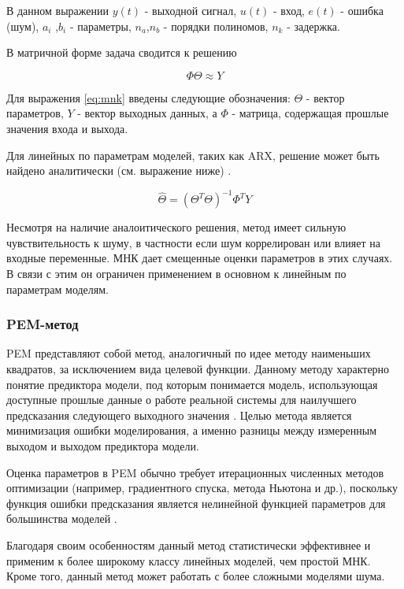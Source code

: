 В данном выражении $ y(t) $ - выходной сигнал,  $u(t)$ - вход, $e(t)$ - ошибка (шум), $a_i$ ,$b_i$ - параметры, $n_a$,$n_b$ - порядки полиномов, $n_k$ - задержка.

В матричной форме задача сводится к решению

\begin{equation}
  \Phi\Theta \approx Y
  \label{eq:mnk}
\end{equation}

Для выражения \ref{eq:mnk} введены следующие обозначения: $\Theta$ - вектор
параметров, $Y$ - вектор выходных данных, а $\Phi$ - матрица, содержащая
прошлые значения входа и выхода.

Для линейных по параметрам моделей, таких как ARX, решение может быть найдено
аналитически (см. выражение ниже) \cite{bib:arx}.

\begin{equation}
  \hat{\Theta} = (\Theta^T \Theta)^{-1} \Phi^T Y
  \label{eq:mnk_arx_sol}
\end{equation}

Несмотря на наличие аналоитического решения,
метод имеет сильную чувствительность к шуму,
в частности если шум коррелирован или влияет
на входные переменные. МНК дает смещенные
оценки параметров в этих случаях. В связи с
этим он ограничен применением в основном к
линейным по параметрам моделям.

\subsubsection{PEM-метод}

PEM представляют собой метод, аналогичный по идее методу наименьших квадратов,
за исключением вида целевой функции. Данному методу характерно понятие
предиктора модели, под которым понимается модель, использующая доступные
прошлые данные о работе реальной системы для наилучшего предсказания следующего
выходного значения \cite{bib:ident:neural:SVD}. Целью метода является минимизация ошибки моделирования, а
именно разницы между измеренным выходом и выходом предиктора модели. 

Оценка параметров в PEM обычно требует итерационных численных методов
оптимизации (например, градиентного спуска, метода Ньютона и др.), поскольку
функция ошибки предсказания является нелинейной функцией параметров для
большинства моделей \cite{bib:ident:control:nonlinear}. 

Благодаря своим особенностям данный метод статистически эффективнее и применим
к более широкому классу линейных моделей, чем простой МНК. Кроме того, данный
метод может работать с более сложными моделями шума.

